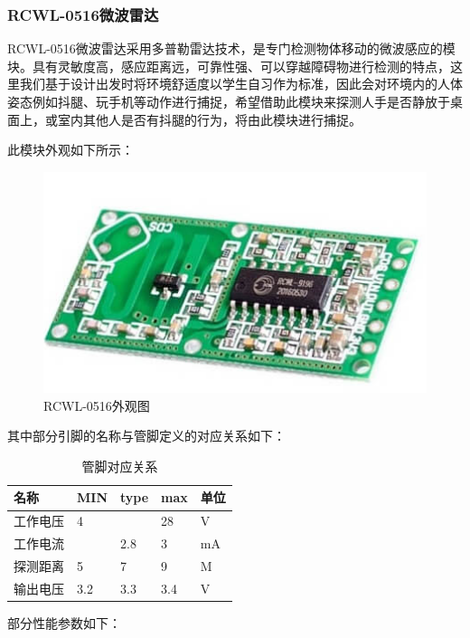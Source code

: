 \documentclass[a4paper, 11pt]{article} %
\begin{document}
\subsubsection{RCWL-0516微波雷达}
\par{} RCWL-0516微波雷达采用多普勒雷达技术，是专门检测物体移动的微波感应的模块。具有灵敏度高，感应距离远，可靠性强、可以穿越障碍物进行检测的特点，这里我们基于设计出发时将环境舒适度以学生自习作为标准，因此会对环境内的人体姿态例如抖腿、玩手机等动作进行捕捉，希望借助此模块来探测人手是否静放于桌面上，或室内其他人是否有抖腿的行为，将由此模块进行捕捉。
\par{} 此模块外观如下所示：
\begin{figure}[H]
  \centering
  \includegraphics[scale = 0.6 ]{1-10.png}
  \caption{RCWL-0516外观图}
  \label{img10} 
\end{figure}
\par{} 其中部分引脚的名称与管脚定义的对应关系如下：
\begin{table}[H]
  \centering
  \caption{管脚对应关系}
  \label{tab5}
  \begin{threeparttable}
    \small
    \begin{tabular} {p{70pt}p{70pt}p{70pt}p{70pt}p{70pt}}
      \hline
      名称&MIN&type&max&单位\\
      \hline
      工作电压&4&&28&V\\
      工作电流&&2.8&3&mA\\
      探测距离&5&7&9&M\\
      输出电压&3.2&3.3&3.4&V\\
      \hline
    \end{tabular}
    \small
  \end{threeparttable}
\end{table}
\par{}部分性能参数如下：
\end{document}
